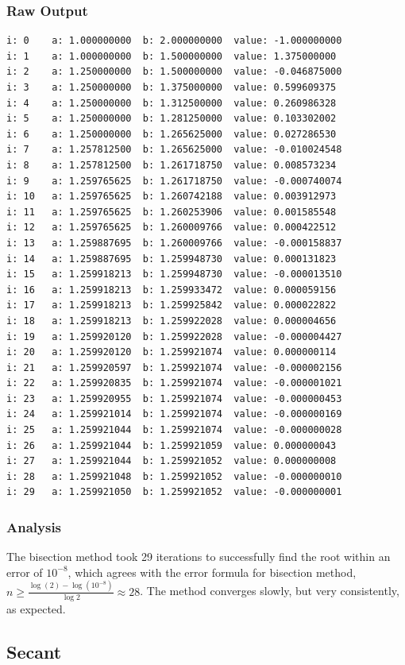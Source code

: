 \documentclass[11pt]{article} %
\begin{document}
\subsubsection*{Raw Output}
\begin{verbatim}
i: 0	a: 1.000000000	b: 2.000000000	value: -1.000000000 
i: 1	a: 1.000000000	b: 1.500000000	value: 1.375000000 
i: 2	a: 1.250000000	b: 1.500000000	value: -0.046875000 
i: 3	a: 1.250000000	b: 1.375000000	value: 0.599609375 
i: 4	a: 1.250000000	b: 1.312500000	value: 0.260986328 
i: 5	a: 1.250000000	b: 1.281250000	value: 0.103302002 
i: 6	a: 1.250000000	b: 1.265625000	value: 0.027286530 
i: 7	a: 1.257812500	b: 1.265625000	value: -0.010024548 
i: 8	a: 1.257812500	b: 1.261718750	value: 0.008573234 
i: 9	a: 1.259765625	b: 1.261718750	value: -0.000740074 
i: 10	a: 1.259765625	b: 1.260742188	value: 0.003912973 
i: 11	a: 1.259765625	b: 1.260253906	value: 0.001585548 
i: 12	a: 1.259765625	b: 1.260009766	value: 0.000422512 
i: 13	a: 1.259887695	b: 1.260009766	value: -0.000158837 
i: 14	a: 1.259887695	b: 1.259948730	value: 0.000131823 
i: 15	a: 1.259918213	b: 1.259948730	value: -0.000013510 
i: 16	a: 1.259918213	b: 1.259933472	value: 0.000059156 
i: 17	a: 1.259918213	b: 1.259925842	value: 0.000022822 
i: 18	a: 1.259918213	b: 1.259922028	value: 0.000004656 
i: 19	a: 1.259920120	b: 1.259922028	value: -0.000004427 
i: 20	a: 1.259920120	b: 1.259921074	value: 0.000000114 
i: 21	a: 1.259920597	b: 1.259921074	value: -0.000002156 
i: 22	a: 1.259920835	b: 1.259921074	value: -0.000001021 
i: 23	a: 1.259920955	b: 1.259921074	value: -0.000000453 
i: 24	a: 1.259921014	b: 1.259921074	value: -0.000000169 
i: 25	a: 1.259921044	b: 1.259921074	value: -0.000000028 
i: 26	a: 1.259921044	b: 1.259921059	value: 0.000000043 
i: 27	a: 1.259921044	b: 1.259921052	value: 0.000000008 
i: 28	a: 1.259921048	b: 1.259921052	value: -0.000000010 
i: 29	a: 1.259921050	b: 1.259921052	value: -0.000000001 
\end{verbatim}

\subsubsection*{Analysis}
The bisection method took 29 iterations to successfully find the root within an error of $10^{-8}$,  which agrees with the error formula for bisection method, $n \geq \frac{\log(2) - \log(10^{-8})}{\log 2} \approx  28$.  The method converges slowly, but very consistently, as expected.
\subsection*{Secant}
\end{document}
